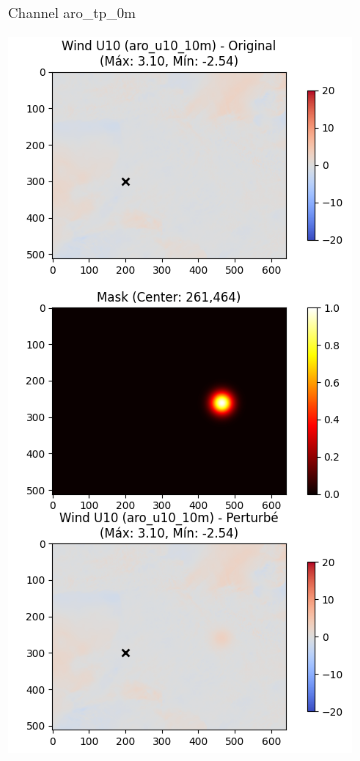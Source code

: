 \begin{figure}[h]
\begin{subfigure}[b]{0.32\textwidth}
        \caption{Channel aro\_tp\_0m}
        \label{fig:titan_perturbed_aro_tp}
    \end{subfigure}
    \hfill
    \begin{subfigure}[b]{0.32\textwidth}
        \includegraphics[width=\textwidth]{Images/titan_rain_perturbations/perturbed_c_u10_10m.png}

\end{subfigure}
\end{figure}
